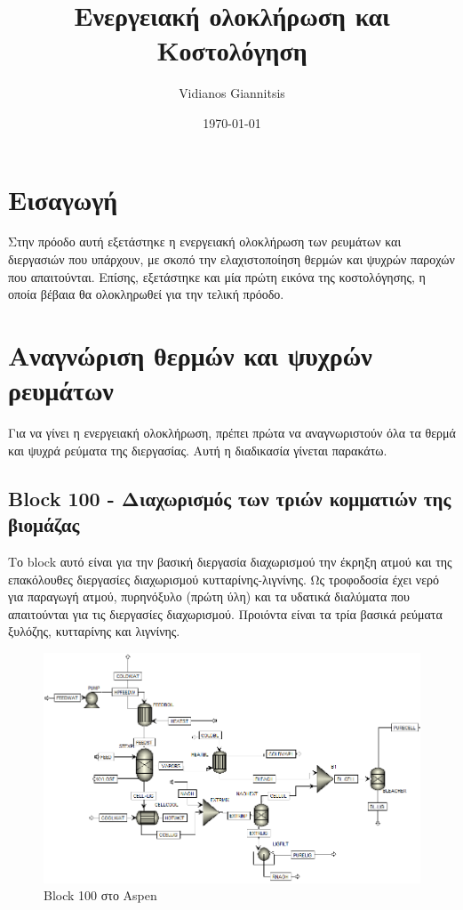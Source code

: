 \documentclass[11pt]{article}
\author{Vidianos Giannitsis}
\date{\today}
\title{Ενεργειακή ολοκλήρωση και Κοστολόγηση}
\begin{document}
\maketitle
\tableofcontents

\renewcommand{\abstractname}{Περίληψη}
\renewcommand{\tablename}{Πίνακας}
\renewcommand{\figurename}{Σχήμα}
\renewcommand\listingscaption{Κώδικας}

\section{Εισαγωγή}
\label{sec:orgefdd95b}
Στην πρόοδο αυτή εξετάστηκε η ενεργειακή ολοκλήρωση των ρευμάτων και διεργασιών που υπάρχουν, με σκοπό την ελαχιστοποίηση θερμών και ψυχρών παροχών που απαιτούνται. Επίσης, εξετάστηκε και μία πρώτη εικόνα της κοστολόγησης, η οποία βέβαια θα ολοκληρωθεί για την τελική πρόοδο.

\section{Αναγνώριση θερμών και ψυχρών ρευμάτων}
\label{sec:org7ffc980}
Για να γίνει η ενεργειακή ολοκλήρωση, πρέπει πρώτα να αναγνωριστούν όλα τα θερμά και ψυχρά ρεύματα της διεργασίας. Αυτή η διαδικασία γίνεται παρακάτω.

\subsection{Block 100 - Διαχωρισμός των τριών κομματιών της βιομάζας}
\label{sec:org93ec461}
Το block αυτό είναι για την βασική διεργασία διαχωρισμού την έκρηξη ατμού και της επακόλουθες διεργασίες διαχωρισμού κυτταρίνης-λιγνίνης. Ως τροφοδοσία έχει νερό για παραγωγή ατμού, πυρηνόξυλο (πρώτη ύλη) και τα υδατικά διαλύματα που απαιτούνται για τις διεργασίες διαχωρισμού. Προιόντα είναι τα τρία βασικά ρεύματα ξυλόζης, κυτταρίνης και λιγνίνης.

\begin{figure}[htbp]
\centering
\includegraphics[width=.9\linewidth]{Block_100_-_Διαχωρισμός_των_τριών_κομματιών_της_βιομάζας/2023-03-11_15-21-38_screenshot.png}
\caption{Block 100 στο Aspen}
\end{figure}
\end{document}
